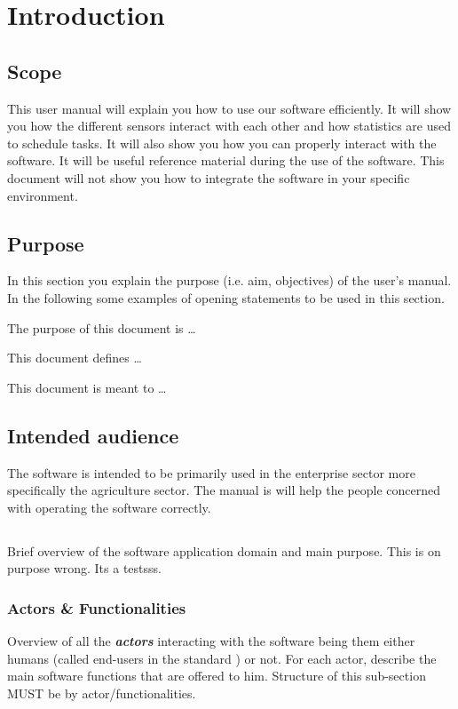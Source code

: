 \chapter{Introduction}
\label{chap:introduction}

\section{Scope}
This user manual will explain you how to use our software efficiently. It will
show you how the different sensors interact with each other and how statistics
are used to schedule tasks. It will also show you how you can properly interact
with the software. It will be useful reference material during the use of the
software. This document will not show you how to integrate the software in your specific environment.


\section{Purpose}
In this section you explain the purpose (i.e. aim, objectives) of the user's
manual. In the following some examples of opening statements to be used in this
section.

The purpose of this document is \ldots

This document defines \ldots

This document is meant to \ldots



\section{Intended audience}
The software is intended to be primarily used in the enterprise sector more specifically the agriculture sector. The manual is will help the people concerned with operating the software correctly.

\section{\mysystemname}
Brief overview of the software application domain and main purpose.
This is on purpose wrong. Its a testsss.


\subsection{Actors \& Functionalities}
Overview of all the \textbf{\emph{\glspl{actor}}} interacting with the software
being them either humans (called end-users in the standard
\cite{IEEE-2001-userdocumentation}) or not. For each actor, describe the main
software functions that are offered to him. Structure of this sub-section MUST
be by actor/functionalities.



